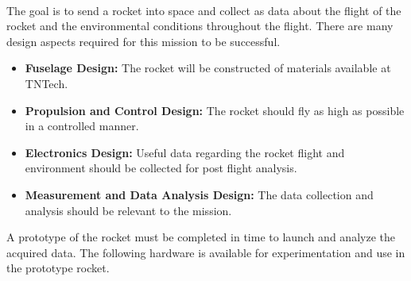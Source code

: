 \documentclass[12pt]{article}
\begin{document}
\begin{description}[labelindent=1cm]
	
	\item[\textbf{\underline{Mission Overview:}}] \hfill \vspace{3mm}\\
	The goal is to send a rocket into space and collect as data about the flight of the rocket and the environmental conditions throughout the flight. There are many design aspects required for this mission to be successful.
	
		\begin{itemize}
			\item {\bf Fuselage Design:} The rocket will be constructed of materials available at TNTech.
			\item {\bf Propulsion and Control Design:} The rocket should fly as high as possible in a controlled manner.
			\item {\bf Electronics Design:} Useful data regarding the rocket flight and environment should be collected for post flight analysis.
			\item {\bf Measurement and Data Analysis Design:} The data collection and analysis should be relevant to the mission.
		\end{itemize}
	
\newpage		
	\item[\textbf{\underline{Available Hardware:}}] \hfill \vspace{0mm}
	A prototype of the rocket must be completed in time to launch and analyze the acquired data. The following hardware is available for experimentation and use in the prototype rocket. 


\end{description}
\end{document}

